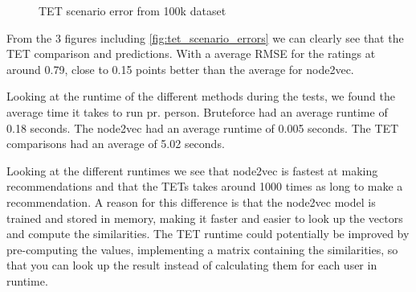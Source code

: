 \begin{figure}[H]
	\centering
	\begin{adjustbox}{width=0.5\textwidth}
		
	\end{adjustbox}
	\caption{TET scenario error from 100k dataset}
	\label{fig:tet_scenario_errors}
\end{figure}

From the $3$ figures including \autoref{fig:tet_scenario_errors} we can clearly see that the TET comparison and predictions.
With a average RMSE for the ratings at around 0.79, close to 0.15 points better than the average for node2vec.

Looking at the runtime of the different methods during the tests, we found the average time it takes to run pr. person.
Bruteforce had an average runtime of 0.18 seconds.
The node2vec had an average runtime of 0.005 seconds.
The TET comparisons had an average of 5.02 seconds.

Looking at the different runtimes we see that node2vec is fastest at making recommendations and that the TETs takes around 1000 times as long to make a recommendation.
A reason for this difference is that the node2vec model is trained and stored in memory, making it faster and easier to look up the vectors and compute the similarities.
The TET runtime could potentially be improved by pre-computing the values, implementing a matrix containing the similarities, so that you can look up the result instead of calculating them for each user in runtime.